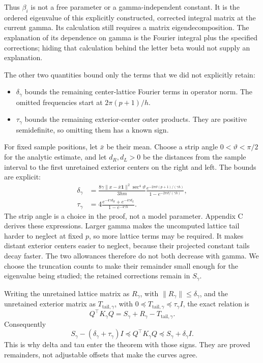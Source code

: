 \documentclass[11pt]{article}
\begin{document}
Thus \(\beta_i\) is not a free parameter or a gamma-independent constant. It is the ordered eigenvalue of this explicitly constructed, corrected integral matrix at the current gamma. Its calculation still requires a matrix eigendecomposition. The explanation of its dependence on gamma is the Fourier integral plus the specified corrections; hiding that calculation behind the letter beta would not supply an explanation.

The other two quantities bound only the terms that we did not explicitly retain:
\begin{itemize}
\item \(\delta_\gamma\) bounds the remaining center-lattice Fourier terms in operator norm. The omitted frequencies start at \(2\pi(p+1)/h\).
\item \(\tau_\gamma\) bounds the remaining exterior-center outer products. They are positive semidefinite, so omitting them has a known sign.
\end{itemize}
For fixed sample positions, let \(\bar x\) be their mean. Choose a strip angle \(0<\vartheta<\pi/2\) for the analytic estimate, and let \(d_R,d_L>0\) be the distances from the sample interval to the first unretained exterior centers on the right and left. The bounds are explicit:
\[
\begin{aligned}
\delta_\gamma&=
\frac{8\gamma\|x-\bar x\mathbf1\|^2\sec^4\vartheta}{3hm}
\frac{e^{-2\pi\vartheta(p+1)/(\gamma h)}}
     {1-e^{-2\pi\vartheta/(\gamma h)}},\\
\tau_\gamma&=4\frac{e^{-4\gamma d_R}+e^{-4\gamma d_L}}
                         {1-e^{-4\gamma h}}.
\end{aligned}
\tag{8a}
\]
The strip angle is a choice in the proof, not a model parameter. Appendix C derives these expressions. Larger gamma makes the uncomputed lattice tail harder to neglect at fixed \(p\), so more lattice terms may be required. It makes distant exterior centers easier to neglect, because their projected constant tails decay faster. The two allowances therefore do not both decrease with gamma. We choose the truncation counts to make their remainder small enough for the eigenvalue being studied; the retained corrections remain in \(S_\gamma\).

Writing the unretained lattice matrix as \(R_\gamma\), with \(\|R_\gamma\|\le\delta_\gamma\), and the unretained exterior matrix as \(T_{\mathrm{tail},\gamma}\), with \(0\preceq T_{\mathrm{tail},\gamma}\preceq\tau_\gamma I\), the exact relation is
\[
Q^\top K_\gamma Q=S_\gamma+R_\gamma-T_{\mathrm{tail},\gamma}.
\]
Consequently
\[
S_\gamma-(\delta_\gamma+\tau_\gamma)I
\preceq Q^\top K_\gamma Q
\preceq S_\gamma+\delta_\gamma I.
\tag{9}
\]
This is why delta and tau enter the theorem with those signs. They are proved remainders, not adjustable offsets that make the curves agree.
\end{document}
